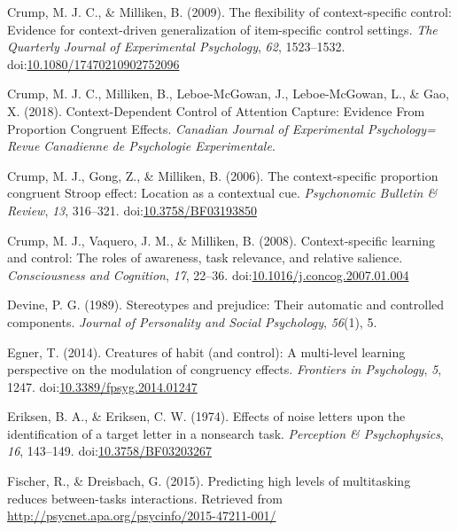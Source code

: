 \documentclass[english,,man,floatsintext]{apa6}
\begin{document}
\leavevmode\hypertarget{ref-crump_flexibility_2009}{}%
Crump, M. J. C., \& Milliken, B. (2009). The flexibility of context-specific control: Evidence for context-driven generalization of item-specific control settings. \emph{The Quarterly Journal of Experimental Psychology}, \emph{62}, 1523--1532. doi:\href{https://doi.org/10.1080/17470210902752096}{10.1080/17470210902752096}

\leavevmode\hypertarget{ref-crump_context-dependent_2018}{}%
Crump, M. J. C., Milliken, B., Leboe-McGowan, J., Leboe-McGowan, L., \& Gao, X. (2018). Context-Dependent Control of Attention Capture: Evidence From Proportion Congruent Effects. \emph{Canadian Journal of Experimental Psychology= Revue Canadienne de Psychologie Experimentale}.

\leavevmode\hypertarget{ref-crump_context-specific_2006}{}%
Crump, M. J., Gong, Z., \& Milliken, B. (2006). The context-specific proportion congruent Stroop effect: Location as a contextual cue. \emph{Psychonomic Bulletin \& Review}, \emph{13}, 316--321. doi:\href{https://doi.org/10.3758/BF03193850}{10.3758/BF03193850}

\leavevmode\hypertarget{ref-crump_context-specific_2008}{}%
Crump, M. J., Vaquero, J. M., \& Milliken, B. (2008). Context-specific learning and control: The roles of awareness, task relevance, and relative salience. \emph{Consciousness and Cognition}, \emph{17}, 22--36. doi:\href{https://doi.org/10.1016/j.concog.2007.01.004}{10.1016/j.concog.2007.01.004}

\leavevmode\hypertarget{ref-devine_stereotypes_1989}{}%
Devine, P. G. (1989). Stereotypes and prejudice: Their automatic and controlled components. \emph{Journal of Personality and Social Psychology}, \emph{56}(1), 5.

\leavevmode\hypertarget{ref-egner_creatures_2014}{}%
Egner, T. (2014). Creatures of habit (and control): A multi-level learning perspective on the modulation of congruency effects. \emph{Frontiers in Psychology}, \emph{5}, 1247. doi:\href{https://doi.org/10.3389/fpsyg.2014.01247}{10.3389/fpsyg.2014.01247}

\leavevmode\hypertarget{ref-eriksen_effects_1974}{}%
Eriksen, B. A., \& Eriksen, C. W. (1974). Effects of noise letters upon the identification of a target letter in a nonsearch task. \emph{Perception \& Psychophysics}, \emph{16}, 143--149. doi:\href{https://doi.org/10.3758/BF03203267}{10.3758/BF03203267}

\leavevmode\hypertarget{ref-fischer_predicting_2015}{}%
Fischer, R., \& Dreisbach, G. (2015). Predicting high levels of multitasking reduces between-tasks interactions. Retrieved from \url{http://psycnet.apa.org/psycinfo/2015-47211-001/}
\end{document}
